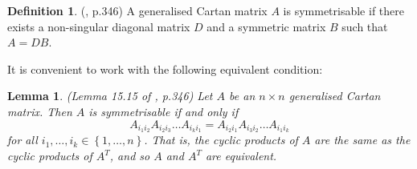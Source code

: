 \documentclass[11pt,a4paper]{report}
\newtheorem{lemma}[theorem]{Lemma}
\theoremstyle{definition}
\newtheorem{definition}[theorem]{Definition}
\begin{document}
\begin{definition} (\cite{Carter}, p.346) A generalised Cartan matrix $A$ is symmetrisable if there exists a non-singular diagonal matrix $D$ and a symmetric matrix $B$ such that $A = DB$. \end{definition}

It is convenient to work with the following equivalent condition:  

\begin{lemma} \label{lem:symmcond} (Lemma 15.15 of \cite{Carter}, p.346) Let $A$ be an $n \times n$ generalised Cartan matrix. Then $A$ is symmetrisable if and only if \begin{equation*}A_{i_1i_2} A_{i_2 i_3} \ldots A_{i_k i_1} = A_{i_2 i_1} A_{i_3 i_2} \ldots A_{i_1 i_k}\end{equation*} for all $i_1, \ldots, i_k \in \left\{1, \ldots,n\right\}$. That is, the cyclic products of $A$ are the same as the cyclic products of $A^T$, and so $A$ and $A^T$ are equivalent.\end{lemma} 
\end{document}
